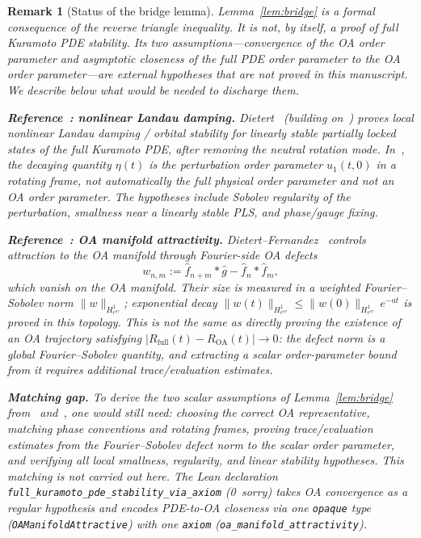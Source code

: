 \documentclass[11pt,a4paper]{article}
\newtheorem{remark}[theorem]{Remark}
\theoremstyle{definition}
\begin{document}
\begin{remark}[Status of the bridge lemma]\label{rem:bridge-hypotheses}
Lemma~\ref{lem:bridge} is a formal consequence of the reverse triangle inequality. It is not, by itself, a proof of full Kuramoto PDE stability. Its two assumptions---convergence of the OA order parameter and asymptotic closeness of the full PDE order parameter to the OA order parameter---are \emph{external hypotheses that are not proved in this manuscript}. We describe below what would be needed to discharge them.

\medskip\noindent\textbf{Reference~\cite{dietert2017}: nonlinear Landau damping.} Dietert~\cite{dietert2017} (building on~\cite{dietert-thesis}) proves local nonlinear Landau damping / orbital stability for linearly stable partially locked states of the full Kuramoto PDE, after removing the neutral rotation mode. In~\cite{dietert2017}, the decaying quantity $\eta(t)$ is the perturbation order parameter $u_1(t,0)$ in a rotating frame, not automatically the full physical order parameter and not an OA order parameter. The hypotheses include Sobolev regularity of the perturbation, smallness near a linearly stable PLS, and phase/gauge fixing.

\medskip\noindent\textbf{Reference~\cite{dietert-fernandez2018}: OA manifold attractivity.} Dietert--Fernandez~\cite{dietert-fernandez2018} controls attraction to the OA manifold through Fourier-side OA defects
\[
w_{n,m} := \hat f_{n+m} * \hat g - \hat f_n * \hat f_m,
\]
which vanish on the OA manifold. Their size is measured in a weighted Fourier--Sobolev norm $\|w\|_{H^1_{e^{a\tau}}}$; exponential decay $\|w(t)\|_{H^1_{e^{a\tau}}} \leq \|w(0)\|_{H^1_{e^{a\tau}}}\,e^{-at}$ is proved in this topology. This is not the same as directly proving the existence of an OA trajectory satisfying $|R_{\mathrm{full}}(t) - R_{\mathrm{OA}}(t)| \to 0$: the defect norm is a global Fourier--Sobolev quantity, and extracting a scalar order-parameter bound from it requires additional trace/evaluation estimates.

\medskip\noindent\textbf{Matching gap.} To derive the two scalar assumptions of Lemma~\ref{lem:bridge} from~\cite{dietert2017} and~\cite{dietert-fernandez2018}, one would still need: choosing the correct OA representative, matching phase conventions and rotating frames, proving trace/evaluation estimates from the Fourier--Sobolev defect norm to the scalar order parameter, and verifying all local smallness, regularity, and linear stability hypotheses. This matching is not carried out here. The Lean declaration \texttt{full\_kuramoto\_pde\_stability\_via\_axiom} (0~sorry) takes OA convergence as a regular hypothesis and encodes PDE-to-OA closeness via one \texttt{opaque} type (\texttt{OAManifoldAttractive}) with one \texttt{axiom} (\texttt{oa\_manifold\_attractivity}).
\end{remark}
\end{document}
